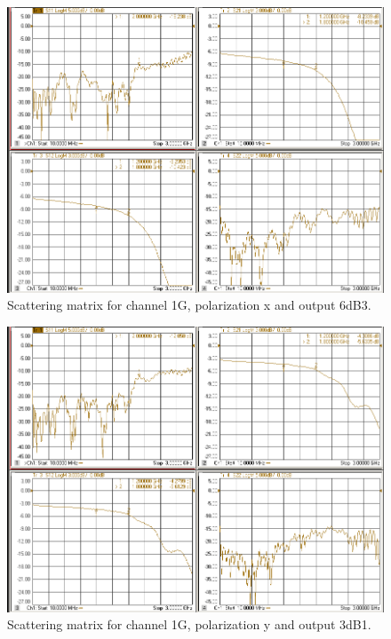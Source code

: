 \documentclass[12pt,a4paper,oneside]{article}
\begin{document}
\begin{figure}[H]
\centering
\includegraphics[width=0.9\linewidth]{VNA_results/1Gx_6dB3.png}
\caption{Scattering matrix for channel 1G, polarization x and output 6dB3.}
\label{fig:1Gx_6dB3}
\end{figure}


\begin{figure}[H]
\centering
\includegraphics[width=0.9\linewidth]{VNA_results/1Gy_3dB1.png}
\caption{Scattering matrix for channel 1G, polarization y and output 3dB1.}
\label{fig:1Gy_3dB1}
\end{figure}
\end{document}

